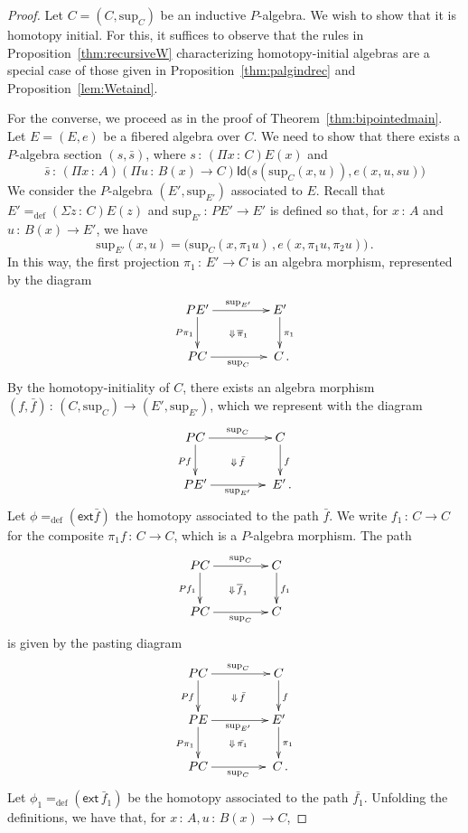 \documentclass[10pt,a4paper,oneside,reqno]{amsart}
\numberwithin{equation}{section}
\theoremstyle{mythm}
\theoremstyle{mydef}
\theoremstyle{myrmk}
\newcommand{\defeq}{=_{\mathrm{def}}}
\newcommand{\co}{\,{:}\,}
\newcommand{\ext}{\mathsf{ext}}
\newcommand{\Id}{\mathsf{Id}}
\renewcommand{\sup}{\mathrm{sup}}
\begin{document}
\begin{proof}
Let $C = (C, \sup_C)$ be an inductive $P$-algebra. We wish to show that it is homotopy initial.
For this, it suffices to observe that the rules in Proposition~\ref{thm:recursiveW} characterizing
homotopy-initial algebras are a special case of those given in Proposition~\ref{thm:palgindrec} and Proposition~\ref{lem:Wetaind}.

For the converse, we proceed as in the proof of
Theorem~\ref{thm:bipointedmain}. 
Let $E = (E, e)$ be a fibered algebra over $C$. We need to show that there
exists a $P$-algebra section $(s, \bar{s})$, where $s \co (\Pi x \co C) E(x)$ and 
\[ 
\bar{s} \co (\Pi x \co A)(\Pi u \co B(x) \to C) \Id \big( s(\sup_C(x,u)), e(x, u, s u) \big)
\]
We consider the $P$-algebra $(E', \sup_{E'})$ associated to $E$. Recall that $E' \defeq
(\Sigma z \co C) E(z)$ and $\sup_{E'} \co PE' \to E'$ is defined so that, for $x \co A$ and $u \co B(x) \to E'$, 
we have
\[
\sup_{E'}(x,u) = \big( \sup_C(x,\pi_1  u) \, , e (x,\pi_1  u, \pi_2  u )\big) \, .
\]
In this way, the first projection $\pi_1 \co E' \to C$  is an algebra morphism, represented by the diagram
 \[
 \xymatrix@C=1.5cm{
 PE' \ar[d]_-{P \pi_1} \ar[r]^{\sup_{E'}} \ar@{}[dr]|{\Downarrow \,  \overline{\pi}_1} & E' \ar[d]^{\pi_1} \\
 PC \ar[r]_{\sup_C} & \; C \, .}
 \]
By the homotopy-initiality of $C$, there exists an algebra morphism $(f, \bar{f}) \co (C, \sup_C)  \to (E', \sup_{E'})$,
which we represent with the diagram
\[
\xymatrix@C=1.5cm{
 PC \ar[r]^{\sup_C} \ar[d]_{Pf}  \ar@{}[dr]|{\Downarrow \, \bar{f}} &  C \ar[d]^{f}\\
PE' \ar[r]_{\sup_{E'}}   & \; E' \, .}
\] 
Let $\phi \defeq (\ext \bar{f})$ the homotopy associated to the path $\bar{f}$. 
We write $f_1 \co C \to C$ for the composite $\pi_1 f \co C \to C$, which is a $P$-algebra morphism. The 
path
\[
\xymatrix@C=1.5cm{
PC \ar[d]_{Pf_1} \ar[r]^-{\sup_{C}} \ar@{}[rd]|{\Downarrow \, \overline{f}_1} & C \ar[d]^{f_1} \\ 
PC  \ar[r]_-{\sup_C} & C }
 \]
is given by the pasting diagram
\[
\xymatrix@C=1.5cm{
 PC \ar[r]^{\sup_C} \ar[d]_{Pf}  \ar@{}[dr]|{\Downarrow \, \bar{f}} &  C \ar[d]^{f}\\
PE \ar[r]_{\sup_{E'}}  \ar[d]_{P\pi_1}   \ar@{}[dr]|{\Downarrow \, \bar{\pi_1}} & E' \ar[d]^{\pi_1}  \\
PC \ar[r]_{\sup_C} & \; C  \, .}
\] 
Let $\phi_1 \defeq (\ext \, \bar{f}_1)$ be the homotopy associated to the path $\bar{f_1}$. 
Unfolding the definitions, we have that, for $x \co A,  u \co B(x) \to C$, 

\end{proof}
\end{document}
